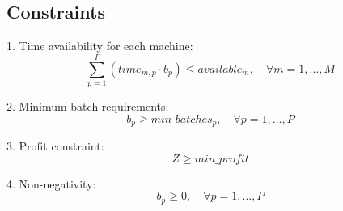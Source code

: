 \documentclass{article}
\begin{document}
\subsection*{Constraints}
1. Time availability for each machine:
   \[
   \sum_{p=1}^{P} (time_{m,p} \cdot b_p) \leq available_m, \quad \forall m = 1, \ldots, M
   \]

2. Minimum batch requirements:
   \[
   b_p \geq min\_batches_p, \quad \forall p = 1, \ldots, P
   \]

3. Profit constraint:
   \[
   Z \geq min\_profit
   \]

4. Non-negativity:
   \[
   b_p \geq 0, \quad \forall p = 1, \ldots, P
   \]
\end{document}
